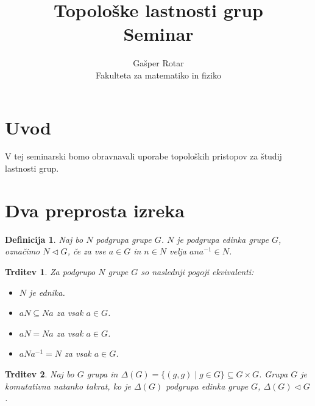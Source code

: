 \documentclass[a4paper,12pt]{article}
\title{Topološke lastnosti grup \\ 
\Large Seminar}
\author{Gašper Rotar \\
Fakulteta za matematiko in fiziko}
\newtheorem{trditev}{Trditev}
\newtheorem{definicija}{Definicija}
\begin{document}
\maketitle

\section{Uvod}

V tej seminarski bomo obravnavali uporabe topoloških pristopov za študij lastnosti grup.



\section{Dva preprosta izreka}

\begin{definicija}
    Naj bo $N$ podgrupa grupe $G$. $N$ je podgrupa \emph{edinka} grupe $G$, označimo $N \triangleleft G$, če za vse $a \in G$ in $n \in N$ velja $ana^{-1} \in N$.
\end{definicija}

\begin{trditev}
    Za podgrupo $N$ grupe $G$ so naslednji pogoji ekvivalenti:
    \begin{itemize}
    \item[\rm (i)] $N$ je ednika.
    \item[\rm (ii)] $aN \subseteq Na$ za vsak $a \in G$.
    \item[\rm (iii)] $aN = Na$ za vsak $a \in G$.
    \item[\rm (iv)] $aNa^{-1} = N$ za vsak $a \in G$. 
    \end{itemize}
\end{trditev}

\begin{trditev}
    Naj bo $G$ grupa in $\Delta(G) = \{(g,g) \mid g \in G \} \subseteq G \times G$.
    Grupa $G$ je komutativna natanko takrat, ko je $\Delta(G)$ podgrupa edinka grupe $G$, $\Delta(G) \triangleleft G$.
\end{trditev}
\end{document}
